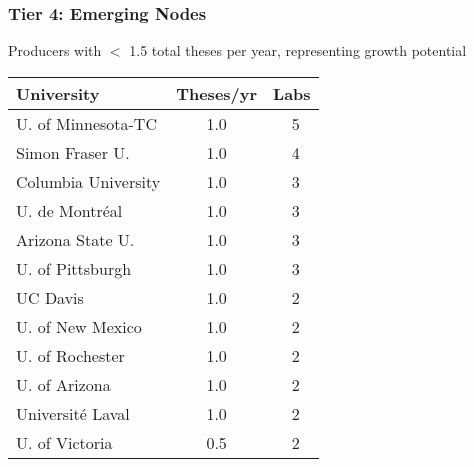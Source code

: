 \documentclass[aspectratio=169]{beamer}
\newcommand{\tabletext}{\small}
\begin{document}
\begin{frame}
    \frametitle{Tier 4: Emerging Nodes}
    Producers with $<$ 1.5 total theses per year, representing growth potential
    
    \begin{table}
        \centering
        \tabletext
        \begin{tabularx}{\textwidth}{
            l
            S[table-format=1.1]
            S[table-format=2.0, table-space-text-pre=~]
        }
            \toprule
            \textbf{University} & {\textbf{Theses/yr}} & {\textbf{Labs}} \\
            \midrule
            U. of Minnesota-TC & 1.0 & ~5 \\
            Simon Fraser U. & 1.0 & ~4 \\
            Columbia University & 1.0 & ~3 \\
            U. de Montréal & 1.0 & ~3 \\
            Arizona State U. & 1.0 & ~3 \\
            U. of Pittsburgh & 1.0 & ~3 \\
            UC Davis & 1.0 & ~2 \\
            U. of New Mexico & 1.0 & ~2 \\
            U. of Rochester & 1.0 & ~2 \\
            U. of Arizona & 1.0 & ~2 \\
            Université Laval & 1.0 & ~2 \\
            U. of Victoria & 0.5 & ~2 \\
            \bottomrule
        \end{tabularx}
    \end{table}
\end{frame}
\end{document}

